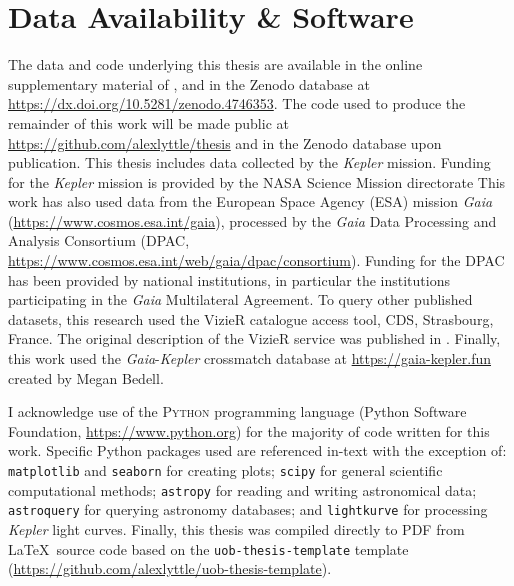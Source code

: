 \chapter*{Data Availability \& Software}

The data and code underlying this thesis are available in the online supplementary material of \citet{Lyttle.Davies.ea2021}, and in the Zenodo database at \url{https://dx.doi.org/10.5281/zenodo.4746353}. The code used to produce the remainder of this work will be made public at \url{https://github.com/alexlyttle/thesis} and in the Zenodo database upon publication. This thesis includes data collected by the \emph{Kepler} mission. Funding for the \emph{Kepler} mission is provided by the NASA Science Mission directorate This work has also used data from the European Space Agency (ESA) mission
\emph{Gaia} (\url{https://www.cosmos.esa.int/gaia}), processed by the {\it Gaia}
Data Processing and Analysis Consortium (DPAC,
\url{https://www.cosmos.esa.int/web/gaia/dpac/consortium}). Funding for the DPAC
has been provided by national institutions, in particular the institutions
participating in the \emph{Gaia} Multilateral Agreement. To query other published datasets, this research used the VizieR catalogue access tool, CDS, Strasbourg, France. The original description of the VizieR service was published in \citet{Ochsenbein.Bauer.ea2000}. Finally, this work used the \emph{Gaia}-\emph{Kepler} crossmatch database at \url{https://gaia-kepler.fun} created by Megan Bedell.

I acknowledge use of the \textsc{Python} programming language (Python Software Foundation, \url{https://www.python.org}) for the majority of code written for this work. Specific Python packages used are referenced in-text with the exception of: \texttt{matplotlib} \citep[v3.6.2;][]{Caswell.Lee.ea2022,Hunter2007} and \texttt{seaborn} \citep{Waskom2021} for creating plots; \texttt{scipy} \citep{Virtanen.Gommers.ea2020} for general scientific computational methods; \texttt{astropy} \citep{AstropyCollaboration.Price-Whelan.ea2022} for reading and writing astronomical data; \texttt{astroquery} \citep{Ginsburg.Sipocz.ea2019} for querying astronomy databases; and \texttt{lightkurve} \citep{LightkurveCollaboration.Cardoso.ea2018} for processing \emph{Kepler} light curves. Finally, this thesis was compiled directly to PDF from \LaTeX~source code based on the \texttt{uob-thesis-template} template (\url{https://github.com/alexlyttle/uob-thesis-template}).
